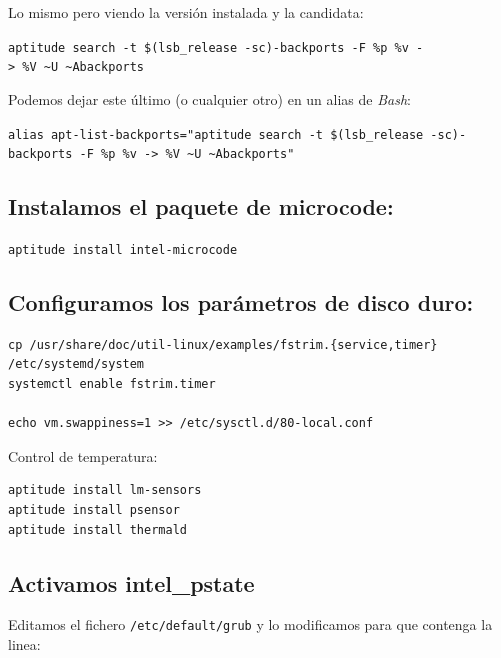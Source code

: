 \documentclass[12pt,spanish,]{scrartcl}
\begin{document}
Lo mismo pero viendo la versión instalada y la candidata:

\texttt{aptitude\ search\ -t\ \$(lsb\_release\ -sc)-backports\ -F\ \textquotesingle{}\%p\ \%v\ -\textgreater{}\ \%V\textquotesingle{}\ \textquotesingle{}\textasciitilde{}U\ \textasciitilde{}Abackports\textquotesingle{}}

Podemos dejar este último (o cualquier otro) en un alias de \emph{Bash}:

\texttt{alias\ apt-list-backports="aptitude\ search\ -t\ \$(lsb\_release\ -sc)-backports\ -F\ \textquotesingle{}\%p\ \%v\ -\textgreater{}\ \%V\textquotesingle{}\ \textquotesingle{}\textasciitilde{}U\ \textasciitilde{}Abackports\textquotesingle{}"}

\hypertarget{instalamos-el-paquete-de-microcode}{%
\subsection{Instalamos el paquete de
microcode:}\label{instalamos-el-paquete-de-microcode}}

\texttt{aptitude\ install\ intel-microcode}

\hypertarget{configuramos-los-paruxe1metros-de-disco-duro}{%
\subsection{Configuramos los parámetros de disco
duro:}\label{configuramos-los-paruxe1metros-de-disco-duro}}

\begin{verbatim}
cp /usr/share/doc/util-linux/examples/fstrim.{service,timer} /etc/systemd/system
systemctl enable fstrim.timer

echo vm.swappiness=1 >> /etc/sysctl.d/80-local.conf
\end{verbatim}

Control de temperatura:

\begin{verbatim}
aptitude install lm-sensors
aptitude install psensor
aptitude install thermald
\end{verbatim}

\hypertarget{activamos-intel_pstate}{%
\subsection{Activamos intel\_pstate}\label{activamos-intel_pstate}}

Editamos el fichero \texttt{/etc/default/grub} y lo modificamos para que
contenga la linea:
\end{document}
